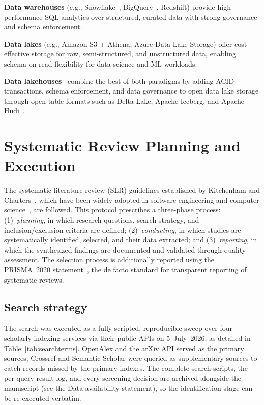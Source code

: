 \documentclass[a4paper,fleqn]{cas-sc}
\begin{document}
\textbf{Data warehouses} (e.g., Snowflake~\cite{Dageville2016}, BigQuery~\cite{Melnik2020Dremel}, Redshift) provide high-performance SQL analytics over structured, curated data with strong governance and schema enforcement.

\textbf{Data lakes} (e.g., Amazon S3 + Athena, Azure Data Lake Storage) offer cost-effective storage for raw, semi-structured, and unstructured data, enabling schema-on-read flexibility for data science and ML workloads.

\textbf{Data lakehouses}~\cite{Armbrust2021Lakehouse} combine the best of both paradigms by adding ACID transactions, schema enforcement, and data governance to open data lake storage through open table formats such as Delta Lake, Apache Iceberg, and Apache Hudi~\cite{Harby2022Lakehouse,Pohl2024LakehouseTS}.


\section{Systematic Review Planning and Execution}
\label{sec:methodology}

The systematic literature review (SLR) guidelines established by Kitchenham and Charters~\cite{Kitchenham2007}, which have been widely adopted in software engineering and computer science~\cite{Salehi2016Granular,Murtaza2020BreastCancer,Qazi2015SolarANN,Saeed2023XAI}, are followed. This protocol prescribes a three-phase process: (1)~\emph{planning}, in which research questions, search strategy, and inclusion/exclusion criteria are defined; (2)~\emph{conducting}, in which studies are systematically identified, selected, and their data extracted; and (3)~\emph{reporting}, in which the synthesized findings are documented and validated through quality assessment. The selection process is additionally reported using the PRISMA~2020 statement~\cite{Page2021PRISMA}, the de facto standard for transparent reporting of systematic reviews.


\subsection{Search strategy}
\label{subsec:searchstrategy}

The search was executed as a fully scripted, reproducible sweep over four scholarly indexing services via their public APIs on 5~July~2026, as detailed in Table~\ref{tab:searchterms}. OpenAlex and the arXiv API served as the primary sources; Crossref and Semantic Scholar were queried as supplementary sources to catch records missed by the primary indexes. The complete search scripts, the per-query result log, and every screening decision are archived alongside the manuscript (see the Data availability statement), so the identification stage can be re-executed verbatim.
\end{document}
